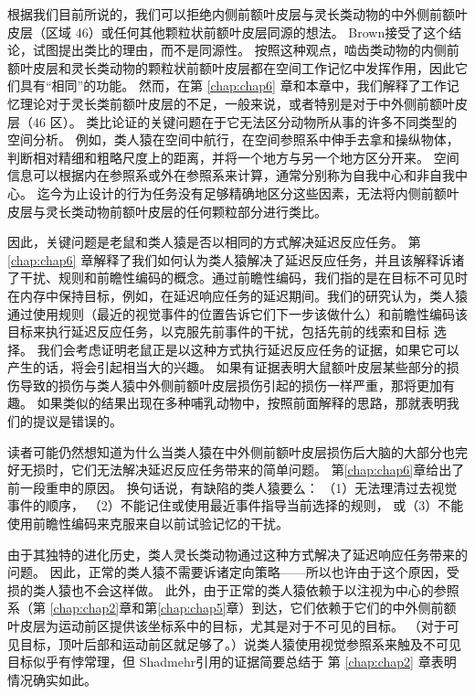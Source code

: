 根据我们目前所说的，我们可以拒绝内侧前额叶皮层与灵长类动物的中外侧前额叶皮层（区域 46）或任何其他颗粒状前额叶皮层同源的想法。
Brown\cite{brown2002rodent}接受了这个结论，试图提出类比的理由，而不是同源性。
按照这种观点，啮齿类动物的内侧前额叶皮层和灵长类动物的颗粒状前额叶皮层都在空间工作记忆中发挥作用，因此它们具有“相同”的功能。
然而，在第 \ref{chap:chap6} 章和本章中，我们解释了工作记忆理论对于灵长类前额叶皮层的不足，一般来说，或者特别是对于中外侧前额叶皮层（46 区）。
类比论证的关键问题在于它无法区分动物所从事的许多不同类型的空间分析。
例如，类人猿在空间中航行，在空间参照系中伸手去拿和操纵物体，判断相对精细和粗略尺度上的距离，并将一个地方与另一个地方区分开来。
空间信息可以根据内在参照系或外在参照系来计算，通常分别称为自我中心和非自我中心。
迄今为止设计的行为任务没有足够精确地区分这些因素，无法将内侧前额叶皮层与灵长类动物前额叶皮层的任何颗粒部分进行类比。
\par


因此，关键问题是老鼠和类人猿是否以相同的方式解决延迟反应任务。
第 \ref{chap:chap6} 章解释了我们如何认为类人猿解决了延迟反应任务，并且该解释诉诸了干扰、规则和前瞻性编码的概念。通过前瞻性编码，我们指的是在目标不可见时在内存中保持目标，例如，在延迟响应任务的延迟期间。我们的研究认为，类人猿通过使用规则（最近的视觉事件的位置告诉它们下一步该做什么）和前瞻性编码该目标来执行延迟反应任务，以克服先前事件的干扰，包括先前的线索和目标 选择。
我们会考虑证明老鼠正是以这种方式执行延迟反应任务的证据，如果它可以产生的话，将会引起相当大的兴趣。
如果有证据表明大鼠额叶皮层某些部分的损伤导致的损伤与类人猿中外侧前额叶皮层损伤引起的损伤一样严重，那将更加有趣。
如果类似的结果出现在多种哺乳动物中，按照前面解释的思路，那就表明我们的提议是错误的。
\par


读者可能仍然想知道为什么当类人猿在中外侧前额叶皮层损伤后大脑的大部分也完好无损时，它们无法解决延迟反应任务带来的简单问题。
第\ref{chap:chap6}章给出了前一段重申的原因。
换句话说，有缺陷的类人猿要么：
（1）无法理清过去视觉事件的顺序，
（2）不能记住或使用最近事件指导当前选择的规则，
或（3）不能 使用前瞻性编码来克服来自以前试验记忆的干扰。
\par


由于其独特的进化历史，类人灵长类动物通过这种方式解决了延迟响应任务带来的问题。
因此，正常的类人猿不需要诉诸定向策略——所以也许由于这个原因，受损的类人猿也不会这样做。
此外，由于正常的类人猿依赖于以注视为中心的参照系（第 \ref{chap:chap2}章和第\ref{chap:chap5}章）到达，它们依赖于它们的中外侧前额叶皮层为运动前区提供该坐标系中的目标，尤其是对于不可见的目标。
（对于可见目标，顶叶后部和运动前区就足够了。）说类人猿使用视觉参照系来触及不可见目标似乎有悖常理，但 Shadmehr\cite{shadmehr2004computational}引用的证据简要总结于 第 \ref{chap:chap2} 章表明情况确实如此。
\par


